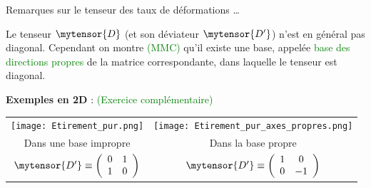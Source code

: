 \begin{frame}{Remarques sur le tenseur des taux de déformations  \ldots}
\small

Le tenseur $\mytensor{D}$ (et son déviateur $\mytensor{D'}$) n'est en général pas diagonal.
Cependant on montre \textcolor{green}{(MMC)} qu'il existe une base, appelée \textcolor{green}{base des directions propres} de la matrice correspondante, dans laquelle le tenseur est diagonal.

\medskip
\pause
{\bf Exemples en 2D } :   \textcolor{green}{(Exercice complémentaire)}
 
\begin{center}
\begin{tabular}{cc}
	\texttt{[image: Etirement\_pur.png]}
	&
	\texttt{[image: Etirement\_pur\_axes\_propres.png]}\\
	Dans une base impropre
	& Dans la base propre 
	\\
	$\mytensor{D'} \equiv  \left(
\begin{array}{cc}
		0 & 1 
		\\
		1 & 0 
	\end{array}
	\right)
	$ & 
	$\mytensor{D'} \equiv  \left(
\begin{array}{cc}
		1 & 0 
		\\
		0 & -1 
	\end{array}
	\right)
	$
\end{tabular}
\end{center}


\end{frame}


